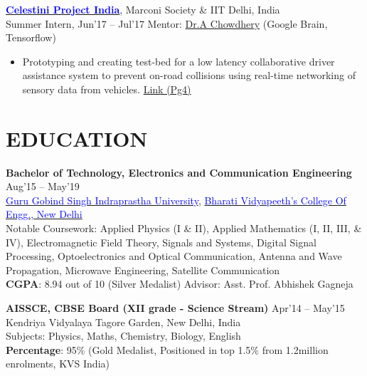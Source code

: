 \documentclass[11pt]{res} %
\newcommand{\titlegap}{5pt} %
\newcommand{\sectgap}{0.05in} %
\begin{document}
\begin{resume}
\vspace{-0.1cm}
\href{https://www.marconisociety.org/programs-services/}{\textbf{\textcolor{blue}{Celestini Project India}}}, Marconi Society \& IIT Delhi, India\\
Summer Intern, Jun'17 – Jul'17 \hfill Mentor: \href{https://achowdhery.github.io/achowdhery-website/index.html}{Dr.A Chowdhery} (Google Brain, Tensorflow)
\begin{itemize}
\item Prototyping and creating test-bed for a low latency collaborative driver assistance system to prevent on-road collisions using real-time networking of sensory data from vehicles. \textcolor{blue}{\href{https://bhartischool.iitd.ac.in/pdf/7thISSUEnewsletter.pdf}{Link (Pg4)}}
\end{itemize}


\vspace{\sectgap}
\hline
\section{EDUCATION} %

\vspace{\titlegap}

{\bf Bachelor of Technology, Electronics and Communication Engineering} \hfill Aug'15 -- May'19 \\ 
\href{http://www.ipu.ac.in/}{\textcolor{blue}{Guru Gobind Singh Indraprastha University}}, \href{http://bvcoend.ac.in}{\textcolor{blue}{Bharati Vidyapeeth's College Of Engg., New Delhi}}\\
Notable Coursework: Applied Physics (I \& II), Applied Mathematics (I, II, III, \& IV), Electromagnetic Field Theory, Signals and Systems, Digital Signal Processing, Optoelectronics and Optical Communication, Antenna and Wave Propagation, Microwave Engineering, Satellite Communication \\
\textbf{CGPA}: 8.94 out of 10 (Silver Medalist) \hspace{0.2in}
\hfill Advisor: Asst. Prof. Abhishek Gagneja

{\bf AISSCE, CBSE Board (XII grade - Science Stream)} \hfill Apr'14 -- May'15 \\ 
Kendriya Vidyalaya Tagore Garden, New Delhi, India\\ 
Subjects: Physics, Maths, Chemistry, Biology, English\\
\textbf{Percentage}: 95\% (Gold Medalist, Positioned in top 1.5\% from 1.2million enrolments, KVS India)


\end{resume}
\end{document}
